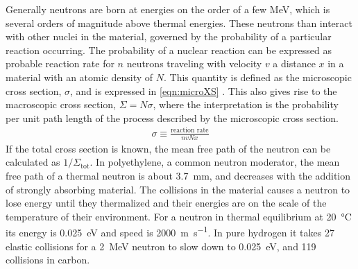 Generally neutrons are born at energies on the order of a few MeV, which is several orders of magnitude above thermal energies.
These neutrons than interact with other nuclei in the material, governed by the probability of a particular reaction occurring.
The probability of a nuclear reaction can be expressed as probable reaction rate for $n$ neutrons traveling with velocity $v$ a distance $x$ in a material with an atomic density of $N$.
This quantity is  defined as the microscopic cross section, $\sigma$, and is expressed in \eqref{eqn:microXS} .
This also gives rise to the macroscopic cross section, $\Sigma=N\sigma$, where the interpretation is the probability per unit path length of the process described by the microscopic cross section.
\begin{align}
	\label{eqn:microXS}
	\sigma \equiv \frac{\text{reaction rate}}{nvNx}
\end{align}
If the total cross section is known, the mean free path of the neutron can be calculated as $1/\Sigma_\text{tot}$.
In polyethylene, a common neutron moderator, the mean free path of a thermal neutron is about \SI{3.7}{\mm}, and decreases with the addition of strongly absorbing material.
The collisions in the material causes a neutron to lose energy until they thermalized and their energies are on the scale of the temperature of their environment.
For a neutron in thermal equilibrium at \SI{20}{\degreeCelsius} its energy is \SI{0.025}{\eV} and speed is \SI{2000}{\m\per\second}.
In pure hydrogen it takes 27 elastic collisions for a \SI{2}{\MeV} neutron to slow down to \SI{0.025}{\electronvolt}, and 119 collisions in carbon.

